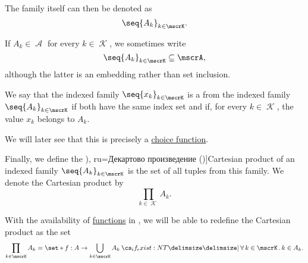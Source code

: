 \begin{definition}
\begin{thmenum}
    The family itself can then be denoted as
    \begin{equation*}
      \seq{ A_k }_{k \in \mscrK}.
    \end{equation*}

    If \( A_k \in \mscrA \) for every \( k \in \mscrK \), we sometimes write
    \begin{equation*}
      \seq{ A_k }_{k \in \mscrK} \subseteq \mscrA,
    \end{equation*}
    although the latter is an embedding rather than set inclusion.

    \mimprovised We say that the indexed family \( \seq{ x_k }_{k \in \mscrK} \) is a  from the indexed family \( \seq{ A_k }_{k \in \mscrK} \) if both have the same index set and if, for every \( k \in \mscrK \), the value \( x_k \) belongs to \( A_k \).

    We will later see that this is precisely a \hyperref[def:choice_function]{choice function}.

     Finally, we define the \term[bg=Декартово произведение (\cite[368]{ГеновМиховскиМоллов1991}), ru=Декартово произведение (\cite[26]{Гуров2013})]{Cartesian product} of an indexed family \( \seq{ A_k }_{k \in \mscrK} \) is the set of all tuples from this family. We denote the Cartesian product by
    \begin{equation*}
      \prod_{k \in \mscrK} A_k.
    \end{equation*}

    With the availability of \hyperref[def:function]{functions} in , we will be able to redefine the Cartesian product as the set
    \begin{equation*}
      \prod_{k \in \mscrK} A_k = \set*{ f: A \to \bigcup_{k \in \mscrK} A_k \given* \qforall {k \in \mscrK} k \in A_k }.
    \end{equation*}
  \end{thmenum}
\end{definition}

